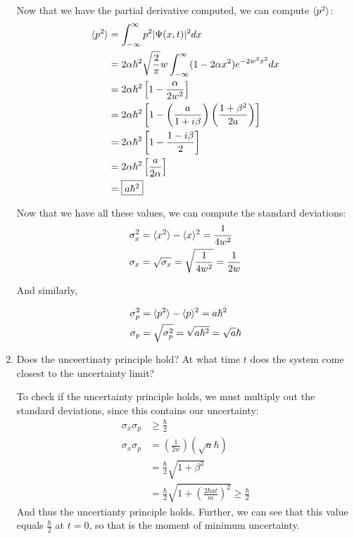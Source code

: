 \documentclass{article}
\begin{document}
\begin{enumerate}[label=(\alph*)]
\begin{solution}
        Now that we have the partial derivative computed, we can compute $\langle p^2 \rangle$:
        \begin{align*}
          \langle p^2 \rangle &= \int_{-\infty}^{\infty} p^2 |\Psi(x,t)|^2dx\\
            &= 2\alpha\hbar^2\sqrt{\frac{2}{\pi}}w\int_{-\infty}^{\infty} (1 - 2\alpha x^2)e^{-2w^2x^2}dx\\
          &= 2\alpha \hbar^2\left[1 - \frac{\alpha}{2w^2}\right]\\
          &= 2\alpha \hbar^2\left[1 - \left(\frac{a}{1+i\beta}\right)\left(\frac{1+\beta^2}{2a}\right)\right] \\
          &= 2\alpha\hbar^2\left[1 - \frac{1 - i\beta}{2}\right]\\
          &= 2\alpha\hbar^2\left[\frac{a}{2\alpha}\right]\\
          &= \fbox{$a\hbar^2$}
        \end{align*}

        Now that we have all these values, we can compute the standard deviations:
        \begin{align*}
          \sigma_x^2 &= \langle x^2 \rangle - \langle x \rangle^2 = \frac{1}{4w^2}\\
          \sigma_x &= \sqrt{\sigma_x} = \sqrt{\frac{1}{4w^2}} = \frac{1}{2w}\\
        \end{align*}

        And similarly, 

        \begin{align*}
          \sigma_p^2 &= \langle p^2 \rangle - \langle p \rangle^2 = a\hbar^2\\
          \sigma_p &= \sqrt{\sigma_p^2} = \sqrt{a\hbar^2} = \sqrt{a}\hbar
        \end{align*}
    \end{solution}
    

    \item Does the unceertinaty principle hold? At what time $t$ does the system come closest to the uncertainty limit?
    
    \begin{solution}
    To check if the uncertainty principle holds, we must multiply out the standard deviations, since this contains our uncertainty:
        \begin{align*}
          \sigma_x\sigma_p &\geq \frac{\hbar}{2}\\
          \sigma_x\sigma_p &= \left(\frac{1}{2w}\right)\left(\sqrt{a}\hbar\right)\\
          &= \frac{\hbar}{2}\sqrt{1 + \beta^2}\\
          &= \frac{\hbar}{2}\sqrt{1 + \left(\frac{2\hbar at}{m}\right)^2} \geq \frac{\hbar}{2}
        \end{align*}
        And thus the uncertianty principle holds. Further, we can see that this value equals $\frac{\hbar}{2}$ at $t = 0$, so that is the moment of minimum uncertainty.


\end{solution}
\end{enumerate}
\end{document}
